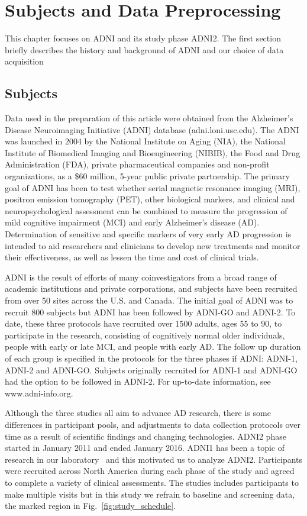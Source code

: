 \chapter{Subjects and Data Preprocessing}
\label{chapter:subjects_perprocessing}
This chapter focuses on ADNI and its study phase ADNI2. The first section briefly describes the history and background of ADNI and our choice of data acquisition   

\section{Subjects}
\label{sec:subjects}
Data used in the preparation of this article were obtained from the Alzheimer\textquoteright s Disease Neuroimaging Initiative (ADNI) database (adni.loni.usc.edu). The ADNI was launched in 2004 by the National Institute on Aging (NIA), the National Institute of Biomedical Imaging and Bioengineering (NIBIB), the Food and Drug Administration (FDA), private pharmaceutical companies and non-profit organizations, as a \$60 million, 5-year public private partnership. The primary goal of ADNI has been to test whether serial magnetic resonance imaging (MRI), positron emission tomography (PET), other biological markers, and clinical and neuropsychological assessment can be combined to measure the progression of mild cognitive impairment (MCI) and early Alzheimer\textquoteright s disease (AD). Determination of sensitive and specific markers of very early AD progression is intended to aid researchers and clinicians to develop new treatments and monitor their effectiveness, as well as lessen the time and cost of clinical trials.

ADNI is the result of efforts of many coinvestigators from a broad range of academic institutions and private corporations, and subjects have been recruited from over 50 sites across the U.S. and Canada. The initial goal of ADNI was to recruit 800 subjects but ADNI has been followed by ADNI-GO and ADNI-2. To date, these three protocols have recruited over 1500 adults, ages 55 to 90, to participate in the research, consisting of cognitively normal older individuals, people with early or late MCI, and people with early AD. The follow up duration of each group is specified in the protocols for the three phases if ADNI: ADNI-1, ADNI-2 and ADNI-GO. Subjects originally recruited for ADNI-1 and ADNI-GO had the option to be followed in ADNI-2. For up-to-date information, see www.adni-info.org.

Although the three studies all aim to advance AD research, there is some differences in participant pools, and adjustments to data collection protocols over time as a result of scientific findings and changing technologies. ADNI2 phase started in January 2011 and ended January 2016. ADNI1 has been a topic of research in our laboratory~\citep{shi2014genetic,zhang2016morphometric} and this motivated us to analyze ADNI2. Participants were recruited across North America during each phase of the study and agreed to complete a variety of clinical assessments. The studies includes participants to make multiple visits but in this study we refrain to baseline and screening data, the marked region in Fig.~\ref{fig:study_schedule}.

